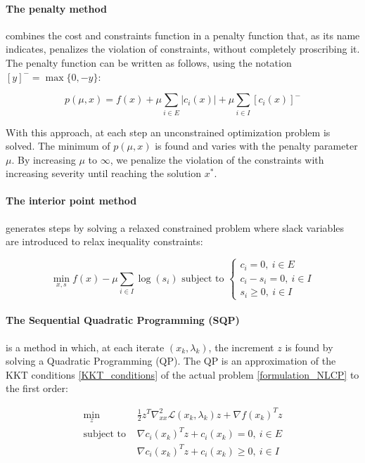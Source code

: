 \paragraph {The penalty method} combines the cost and constraints function in a penalty function that, as its name indicates, penalizes the violation of constraints, without completely proscribing it.
The penalty function can be written as follows, using the notation $[y]^- = \max\{0, -y\}$:

\begin{equation}
  p(\mu, x) = f(x) + \mu \sum_{i\in E}|c_i(x)| + \mu \sum_{i\in I} [c_i(x)]^-
\end{equation}

With this approach, at each step an unconstrained optimization problem is solved.
The minimum of $p(\mu,x)$ is found and varies with the penalty parameter $\mu$.
By increasing $\mu$ to $\infty$, we penalize the violation of the constraints with increasing severity until reaching the solution $x^*$.

\paragraph{The interior point method} generates steps by solving a relaxed constrained problem where slack variables are introduced to relax inequality constraints:

\begin{equation}
  \min_{x,s}{ f(x)- \mu\sum_{i\in I} \log(s_i)}
  \text{ subject to }
  \left\{
    \begin{array}{l}
     c_i = 0,\ i\in E\\
     c_i - s_i = 0,\ i\in I\\
     s_i \geq 0,\ i\in I
  \end{array}
  \right.
\end{equation}

\paragraph{The Sequential Quadratic Programming (SQP)} is a method in which, at each iterate $(x_k, \lambda_k)$, the increment $z$ is found by solving a Quadratic Programming (QP).
The QP is an approximation of the KKT conditions \ref{KKT_conditions} of the actual problem \ref{formulation_NLCP} to the first order:

\begin{equation}
  \label{approx_QP}
  \begin{array}{ll}
    \min_{z}{} & \frac{1}{2}z^T\nabla_{xx}^2\mathcal{L}(x_k, \lambda_k)z + \nabla f(x_k)^Tz \\
    \text{subject to } & \nabla c_i(x_k)^Tz+c_i(x_k)=0,\ i\in E \\
                       & \nabla c_i(x_k)^Tz+c_i(x_k)\geq 0,\ i\in I
  \end{array}
\end{equation}

